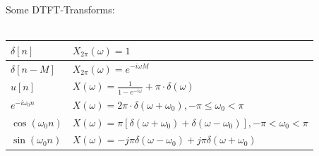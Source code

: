 Some DTFT-Transforms: \\ \\
\begin{tabularx}{0.7\textwidth}{|l|X|}
	\hline
	$\delta[n]$ &	$X_{2\pi}(\omega) = 1$ \\
	\hline 	
	$\delta[n-M]$ &	$X_{2\pi}(\omega) = e^{-i\omega M}$ \\
	\hline
	$u[n]$ & %
	$X(\omega) = \frac{1}{1-e^{-i \omega}} + \pi \cdot \delta (\omega) $ \\
	\hline
	$e^{-i \omega_0 n}$ &	$X(\omega) = 2\pi\cdot \delta (\omega +\omega_0),     -\pi \leq \omega_0 < \pi$ \\
	\hline
	$\cos(\omega_0 n) $ & $X(\omega) = \pi [\delta (\omega +\omega_0)+\delta (\omega -\omega_0)],     -\pi < \omega_0 < \pi $\\
	\hline
	$\sin(\omega_0 n) $ & $X(\omega) = -j \pi \delta(\omega - \omega_0) + j \pi \delta(\omega + \omega_0)$\\
	\hline
\end{tabularx} \\ \\

\newpage

